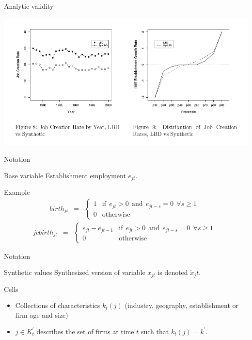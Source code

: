 \begin{frame}{Analytic validity}
\begin{center}
\includegraphics[width=\textwidth]{./CES-WP-11-04-page39-hilite}
\end{center}
\end{frame}




\begin{frame}{Notation}

\begin{block}{Base variable}
Establishment employment $e_{jt}$. 
\end{block}
\begin{block}{Example}
\begin{eqnarray}
\label{eq:e_birth}
birth_{jt} &=& \left \lbrace 
\begin{array}{rl}
1 &\mbox{if}~~  e_{jt} > 0 ~~ \mbox{and}  ~~e_{jt-s} = 0 ~~\forall s\geq 1~~\\
0 &\mbox{otherwise}
\end{array} \right .
\end{eqnarray}
\begin{eqnarray}
\label{eq:e_birth2}
jcbirth_{jt} &=& \left \lbrace 
\begin{array}{rl}
e_{jt}-e_{jt-1} &\mbox{if}~~  e_{jt} > 0 ~~ \mbox{and}  ~~e_{jt-s} = 0 ~~\forall s\geq 1~~\\
0 &\mbox{otherwise}
\end{array} \right .
\end{eqnarray}
\end{block}
\end{frame}

\begin{frame}{Notation}
\begin{block}{Synthetic values}
Synthesized version of variable $x_{jt}$ is 
denoted $\tilde{x}_jt$. 
\end{block}
\begin{block}{Cells}
\begin{itemize}
\item[]
Collections of characteristics $k_t(j)$ (industry, geography, establishment or firm age and size)
\item[]  $j \in 
K_t^\prime$ describes the set of firms at time $t$ such that $k_t(j)=k^\prime$.  

\end{itemize}
\end{block}
\end{frame}

